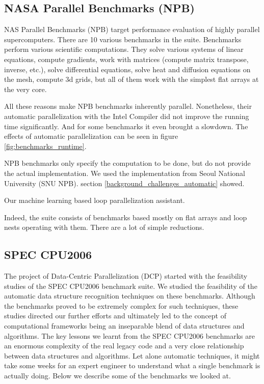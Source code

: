 \subsection{NASA Parallel Benchmarks (NPB)}
\label{background_benchmarks_npb}
\quad NAS Parallel Benchmarks (NPB) target performance evaluation of highly parallel supercomputers. There are 10 various benchmarks in the suite. Benchmarks perform various scientific computations. They solve various systems of linear equations, compute gradients, work with matrices (compute matrix transpose, inverse, etc.), solve differential equations, solve heat and diffusion equations on the mesh, compute 3d grids, but all of them work with the simplest flat arrays at the very core. 



All these reasons make NPB benchmarks inherently parallel. Nonetheless, their automatic parallelization with the Intel Compiler did not improve the running time significantly. And for some benchmarks it even brought a slowdown. The effects of automatic parallelization can be seen in figure \ref{fig:benchmarks_runtime}. 


NPB benchmarks only specify the computation to be done, but do not provide the actual implementation. We used the implementation from Seoul National University (SNU NPB).
section \ref{background_challenges_automatic} showed. 


Our machine learning based loop parallelization assistant. 

Indeed, the suite consists of benchmarks based mostly on flat arrays and loop nests operating with them. There are a lot of simple reductions.    



\subsection{SPEC CPU2006}
\label{background_benchmarks_spec}
\quad The project of Data-Centric Parallelization (DCP) started with the feasibility studies of the SPEC CPU2006 benchmark suite. We studied the feasibility of the automatic data structure recognition techniques on these benchmarks. Although the benchmarks proved to be extremely complex for such techniques, these studies directed our further efforts and ultimately led to the concept of computational frameworks being an inseparable blend of data structures and algorithms. The key lessons we learnt from the SPEC CPU2006 benchmarks are an enormous complexity of the real legacy code and a very close relationship between data structures and algorithms. Let alone automatic techniques, it might take some weeks for an expert engineer to understand what a single benchmark is actually doing. Below we describe some of the benchmarks we looked at.
